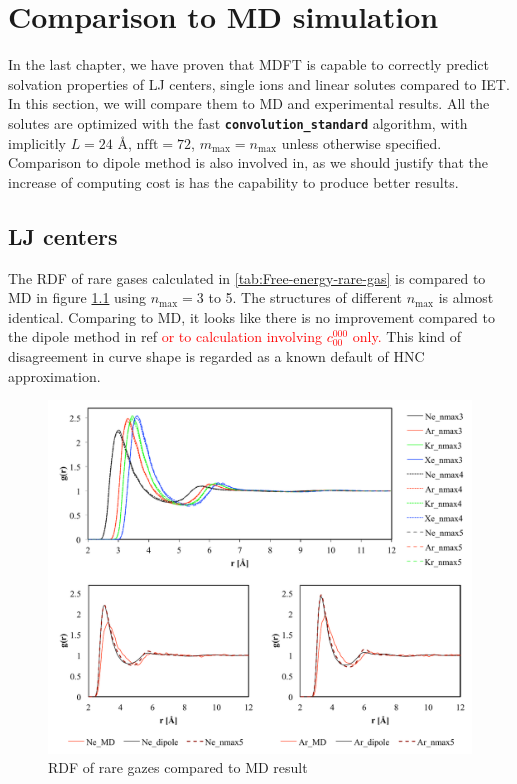 
\chapter{Comparison to MD simulation\label{chpt:ions}}

In the last chapter, we have proven that \acs{MDFT} is capable to
correctly predict solvation properties of LJ centers, single ions
and linear solutes compared to \acs{IET}. In this section, we will
compare them to \acs{MD} and experimental results. All the solutes
are optimized with the fast \texttt{\textbf{convolution\_standard}}
algorithm, with implicitly $L=24$ $\textrm{Å}$, $\mathrm{nfft}=72$,
$m_{\max}=n_{\max}$ unless otherwise specified. Comparison to dipole
method is also involved in, as we should justify that the increase
of computing cost is has the capability to produce better results. 

\section{LJ centers}

The \acs{RDF} of rare gases calculated in \ref{tab:Free-energy-rare-gas}
is compared to \acs{MD} in figure \ref{fig:rare-gazz} using $n_{\max}=3$
to 5. The structures of different $n_{\max}$ is almost identical.
Comparing to \acs{MD}, it looks like there is no improvement compared
to the dipole method in ref \citep{Zhao_2011} \textcolor{red}{or
to calculation involving $c_{00}^{000}$ only.} This kind of disagreement
in curve shape is regarded as a known default of \acs{HNC} approximation.

\begin{figure}[h]
\begin{centering}
\includegraphics[width=0.9\columnwidth]{_figure/results/rare_gaz}
\par\end{centering}
\caption{\acs{RDF} of rare gazes compared to \acs{MD} result\label{fig:rare-gazz}}
\end{figure}


